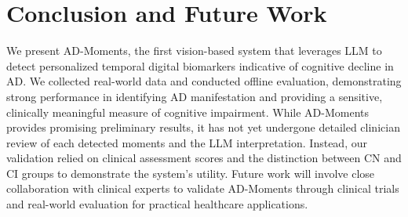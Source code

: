 \documentclass[sigconf, anonymous, 9pt, nonacm]{acmart}
\newcommand{\sys}{AD-Moments\xspace}
\begin{document}
\section{Conclusion and Future Work}
\label{sec:conclusion}

We present \sys, the first vision-based system that leverages LLM to detect personalized temporal digital biomarkers indicative of cognitive decline in AD. We collected real-world data and conducted offline evaluation, demonstrating strong performance in identifying AD manifestation and providing a sensitive, clinically meaningful measure of cognitive impairment.
While \sys provides promising preliminary results, it has not yet undergone detailed clinician review of each detected moments and the LLM interpretation. Instead, our validation relied on clinical assessment scores and the distinction between CN and CI groups to demonstrate the system's utility. Future work will involve close collaboration with clinical experts to validate \sys through clinical trials and real-world evaluation for practical healthcare applications.



\balance

%

\end{document}
